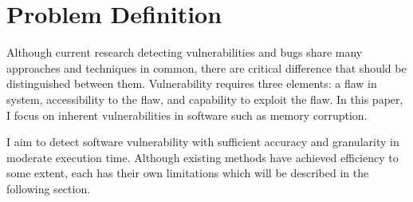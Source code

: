 \section{Problem Definition}
\label{section:problem}

Although current research detecting vulnerabilities and bugs share many approaches and techniques in common,
there are critical difference that should be distinguished between them.
Vulnerability requires three elements: a flaw in system, accessibility to the flaw, and capability to exploit the flaw.
In this paper, I focus on inherent vulnerabilities in software such as memory corruption.

I aim to detect software vulnerability with sufficient accuracy and granularity in moderate execution time.
Although existing methods have achieved efficiency to some extent, each has their own limitations which will be described in the following section.